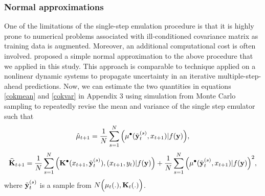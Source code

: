 
\subsubsection{Normal approximations}
One of the limitations of the single-step emulation procedure is that it is highly prone to numerical problems associated with ill-conditioned covariance matrix as training data is augmented. Moreover, an additional computational cost is often involved. \citet{pd12} proposed a simple normal approximation to the above procedure that we applied in this study. This approach is comparable to \citet{pd17} technique applied on a nonlinear dynamic systems to propagate uncertainty in an iterative multiple-step-ahead predictions. Now, we can estimate the two quantities in equations \ref{cokmean} and \ref{cokvar} in Appendix 3 using simulation from Monte Carlo sampling to repeatedly revise the mean and variance of the single step emulator such that
\begin{equation}\label{norm1}
\hat \mu_{t+1}=\frac{1}{N}\sum \limits_{s=1}^N\Big(\mu^{\bullet}({\tilde {\bf y}}^{(s)}_t, x_{t+1})|f({\bf y})\Big),
\end{equation}
\begin{equation}\label{norm2}
\widehat {{\mathbf{K}}}_{t+1}= \frac{1}{N}\sum \limits_{s=1}^N\Big({\mathbf{K}}^{\bullet}(x_{t+1},{\tilde {\bf y}}^{(s)}_t),(x_{t+1},y_t)|f({\bf y})\Big) +\frac{1}{N}\sum \limits_{s=1}^N \Big(\mu^{\bullet}({\tilde {\bf y}}^{(s)}_t, x_{t+1})|f({\bf y})\Big)^2,
\end{equation}
where ${\tilde {\bf y}}^{(s)}_t$ is a sample from $N\Big(\mu_t(.), {\mathbf{K}}_t(.)\Big)$. %



